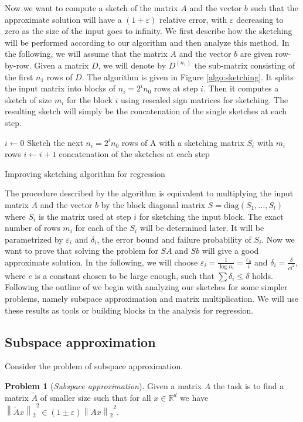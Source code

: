 \documentclass[a4paper,11pt,oneside,english,onecolumn]{article}
\theoremstyle{definition}
\newtheorem{problem}{Problem}
\newcommand{\norm}[1]{\ensuremath{\left\| #1\right\|_2}}
\newcommand{\REAL}{\ensuremath{\mathbb{R}}}
\newcommand{\eps}{\ensuremath{\varepsilon}}
\begin{document}
Now we want to compute a sketch of the matrix $A$ and the vector $b$ such that the approximate solution will have a $(1 + \eps)$ relative error, with $\eps$ decreasing to zero as the size of the input goes to infinity. We first describe how the sketching will be performed according to our algorithm and then analyze this method. In the following, we will assume that the matrix $A$ and the vector $b$ are given row-by-row. Given a matrix $D$, we will denote by $D^{(n_1)}$ the sub-matrix consisting of the first $n_1$ rows of $D$. The algorithm is given in Figure \ref{algo:sketching}. It splits the input matrix into blocks of $n_i=2^i n_0$ rows at step $i$. Then it computes a sketch of size $m_i$ for the block $i$ using rescaled sign matrices for sketching. The resulting sketch will simply be the concatenation of the single sketches at each step.

\begin{algorithm}
\DontPrintSemicolon \KwIn{Matrix $A\in\REAL^{n\times d}$ given row-by-row}
$i \gets 0$\;
 {
Sketch the next $n_i=2^i n_0$ rows of A with a sketching matrix $S_i$ with $m_i$ rows\;
  $i \gets i+1$\;
}
\Return concatenation of the sketches at each step\;
\caption{Improving sketching algorithm for regression}
\label{algo:sketching}
\end{algorithm}

The procedure described by the algorithm is equivalent to multiplying the input matrix $A$ and the vector $b$ by the block diagonal matrix $S = \mathrm{diag}(S_1, \ldots, S_l)$ where $S_i$ is the matrix used at step $i$ for sketching the input block. The exact number of rows $m_i$ for each of the $S_i$ will be determined later. It will be parametrized by $\eps_i$ and $\delta_i$, the error bound and failure probability of $S_i$. Now we want to prove that solving the problem for $SA$ and $Sb$ will give a good approximate solution.
In the following, we will choose $\eps_i = \frac{1}{\log n_i} = \frac{\eps_0}{i}$ and $\delta_i = \frac{\delta}{ci^2}$, where $c$ is a constant chosen to be large enough, such that $ \sum \delta_i \leq \delta$ holds. Following the outline of \cite{LinAlgStream} we begin with analyzing our sketches for some simpler problems, namely subspace approximation and matrix multiplication. We will use these results as tools or building blocks in the analysis for regression.

\subsection{Subspace approximation}
Consider the problem of subspace approximation.
\begin{problem}[\emph{Subspace approximation}]
Given a matrix $A$ the task is to find a matrix $\tilde A$ of smaller size such that for all $x \in \REAL ^d$ we have $\norm{\tilde A x }^2 \in (1 \pm  \eps) \norm{Ax}^2.$
\end{problem}
\end{document}
